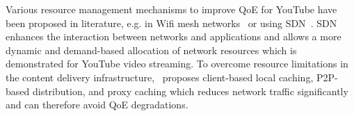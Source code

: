Various resource management mechanisms to improve \gls{QoE} for YouTube have been proposed in literature, e.g. in Wifi mesh networks~\cite{Wamser2013} or using \gls{SDN}~\cite{Zinner2014}. \gls{SDN} enhances the interaction between networks and applications and allows a more dynamic and demand-based allocation of network resources which is demonstrated for YouTube video streaming.
To overcome resource limitations in the content delivery infrastructure,~\cite{Zink2008} proposes client-based local caching, \gls{P2P}-based distribution, and proxy caching which reduces network traffic significantly and can therefore avoid \gls{QoE} degradations.